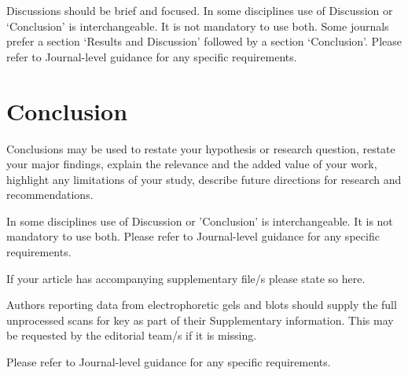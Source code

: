 \documentclass[lineno,pdflatex,sn-nature]{sn-jnl}%
\begin{document}
Discussions should be brief and focused. In some disciplines use of Discussion or `Conclusion' is interchangeable. It is not mandatory to use both. Some journals prefer a section `Results and Discussion' followed by a section `Conclusion'. Please refer to Journal-level guidance for any specific requirements. 

\section{Conclusion}\label{sec13}

Conclusions may be used to restate your hypothesis or research question, restate your major findings, explain the relevance and the added value of your work, highlight any limitations of your study, describe future directions for research and recommendations. 

In some disciplines use of Discussion or 'Conclusion' is interchangeable. It is not mandatory to use both. Please refer to Journal-level guidance for any specific requirements. 

\backmatter


If your article has accompanying supplementary file/s please state so here. 

Authors reporting data from electrophoretic gels and blots should supply the full unprocessed scans for key as part of their Supplementary information. This may be requested by the editorial team/s if it is missing.

Please refer to Journal-level guidance for any specific requirements.

\end{document}
